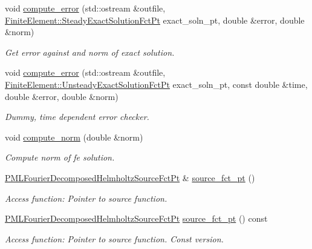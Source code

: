 \begin{DoxyCompactItemize}
void \hyperlink{classoomph_1_1PMLFourierDecomposedHelmholtzEquationsBase_af4ee9a1e9ae746b8d22835ecbdcd9f1f}{compute\+\_\+error} (std\+::ostream \&outfile, \hyperlink{classoomph_1_1FiniteElement_a690fd33af26cc3e84f39bba6d5a85202}{Finite\+Element\+::\+Steady\+Exact\+Solution\+Fct\+Pt} exact\+\_\+soln\+\_\+pt, double \&error, double \&norm)
\begin{DoxyCompactList}\small\item\em Get error against and norm of exact solution. \end{DoxyCompactList}\item 
void \hyperlink{classoomph_1_1PMLFourierDecomposedHelmholtzEquationsBase_af763ba67459975b5afbc5933c248272d}{compute\+\_\+error} (std\+::ostream \&outfile, \hyperlink{classoomph_1_1FiniteElement_ad4ecf2b61b158a4b4d351a60d23c633e}{Finite\+Element\+::\+Unsteady\+Exact\+Solution\+Fct\+Pt} exact\+\_\+soln\+\_\+pt, const double \&time, double \&error, double \&norm)
\begin{DoxyCompactList}\small\item\em Dummy, time dependent error checker. \end{DoxyCompactList}\item 
void \hyperlink{classoomph_1_1PMLFourierDecomposedHelmholtzEquationsBase_a74c7136878535e68ba828d9c55b74173}{compute\+\_\+norm} (double \&norm)
\begin{DoxyCompactList}\small\item\em Compute norm of fe solution. \end{DoxyCompactList}\item 
\hyperlink{classoomph_1_1PMLFourierDecomposedHelmholtzEquationsBase_a2e749d98392af2109b41dca0ae618b79}{P\+M\+L\+Fourier\+Decomposed\+Helmholtz\+Source\+Fct\+Pt} \& \hyperlink{classoomph_1_1PMLFourierDecomposedHelmholtzEquationsBase_a92c5f9b24a1259477c27a53a7b016931}{source\+\_\+fct\+\_\+pt} ()
\begin{DoxyCompactList}\small\item\em Access function\+: Pointer to source function. \end{DoxyCompactList}\item 
\hyperlink{classoomph_1_1PMLFourierDecomposedHelmholtzEquationsBase_a2e749d98392af2109b41dca0ae618b79}{P\+M\+L\+Fourier\+Decomposed\+Helmholtz\+Source\+Fct\+Pt} \hyperlink{classoomph_1_1PMLFourierDecomposedHelmholtzEquationsBase_a5c59e0beae6565d129fd672bd96d9b1d}{source\+\_\+fct\+\_\+pt} () const
\begin{DoxyCompactList}\small\item\em Access function\+: Pointer to source function. Const version. \end{DoxyCompactList}\item 

\end{DoxyCompactItemize}
